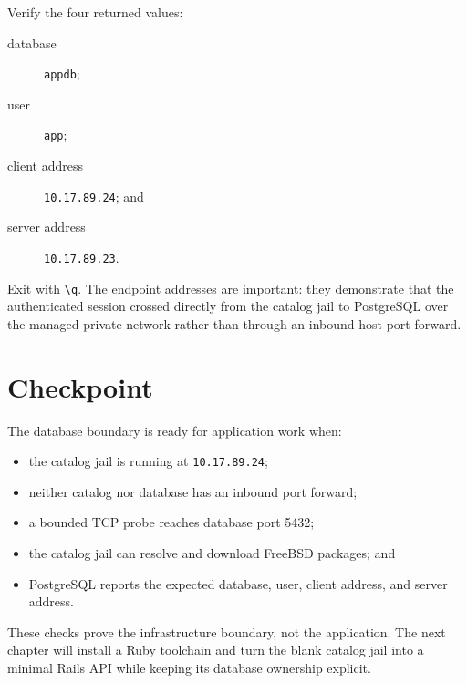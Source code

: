 Verify the four returned values:

\begin{description}
  \item[database] \texttt{appdb};
  \item[user] \texttt{app};
  \item[client address] \texttt{10.17.89.24}; and
  \item[server address] \texttt{10.17.89.23}.
\end{description}

Exit with \texttt{\textbackslash q}. The endpoint addresses are important:
they demonstrate that the authenticated session crossed directly from the
catalog jail to PostgreSQL over the managed private network rather than through
an inbound host port forward.

\section{Checkpoint}

The database boundary is ready for application work when:

\begin{itemize}
  \item the catalog jail is running at \texttt{10.17.89.24};
  \item neither catalog nor database has an inbound port forward;
  \item a bounded TCP probe reaches database port 5432;
  \item the catalog jail can resolve and download FreeBSD packages; and
  \item PostgreSQL reports the expected database, user, client address, and
    server address.
\end{itemize}

These checks prove the infrastructure boundary, not the application. The next
chapter will install a Ruby toolchain and turn the blank catalog jail into a
minimal Rails API while keeping its database ownership explicit.
